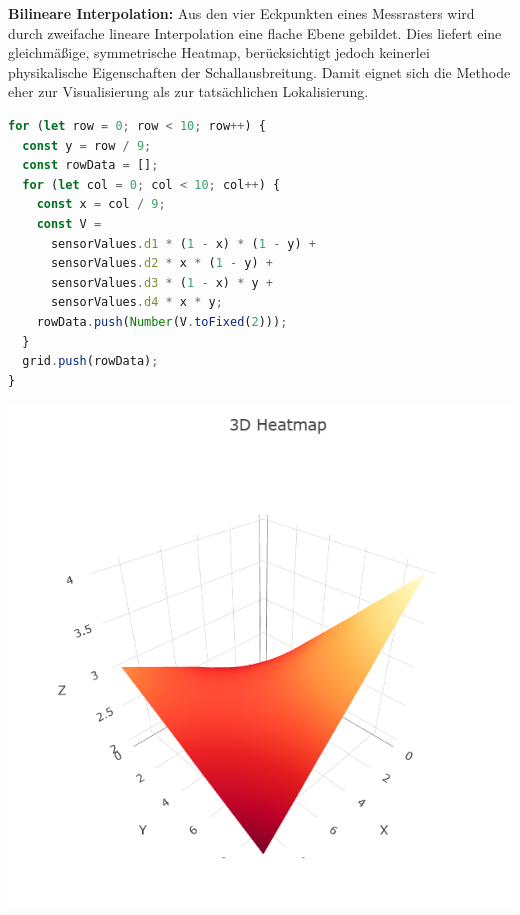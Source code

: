 \textbf{Bilineare Interpolation:}  
Aus den vier Eckpunkten eines Messrasters wird durch zweifache lineare Interpolation eine flache Ebene gebildet. Dies liefert eine gleichmäßige, symmetrische Heatmap, berücksichtigt jedoch keinerlei physikalische Eigenschaften der Schallausbreitung. Damit eignet sich die Methode eher zur Visualisierung als zur tatsächlichen Lokalisierung.
\begin{lstlisting}[language=JavaScript, caption={Bilineare Interpolation}]
for (let row = 0; row < 10; row++) {
  const y = row / 9;
  const rowData = [];
  for (let col = 0; col < 10; col++) {
    const x = col / 9;
    const V =
      sensorValues.d1 * (1 - x) * (1 - y) +
      sensorValues.d2 * x * (1 - y) +
      sensorValues.d3 * (1 - x) * y +
      sensorValues.d4 * x * y;
    rowData.push(Number(V.toFixed(2)));
  }
  grid.push(rowData);
}
\end{lstlisting}
\begin{minipage}[b]{0.5\textwidth}
  \includegraphics[width=\textwidth]{../images/Heatmap/IBHeatmap.png}
\end{minipage}

